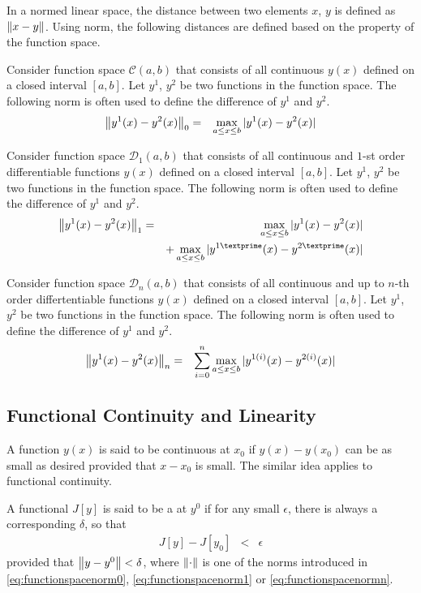 In a normed linear space, the distance between two elements $x$, $y$ is defined as $\left\lVert x-y\right\rVert$. Using norm, the following distances are defined based on the property of the function space.

Consider function space $\mathcal{C}(a,b)$ that consists of all continuous $y(x)$ defined on a closed interval $[a,b]$. Let $y^1$, $y^2$ be two functions in the function space. The following norm is often used to define the difference of $y^1$ and $y^2$.
\begin{eqnarray}
  \left\lVert y^1(x) - y^2(x)\right\rVert_0 &=& \max_{a\leq x \leq b} |y^1(x)-y^2(x)| \label{eq:functionspacenorm0}
\end{eqnarray}

Consider function space $\mathcal{D}_1(a,b)$ that consists of all continuous and $1$-st order differentiable functions $y(x)$ defined on a closed interval $[a,b]$. Let $y^1$, $y^2$ be two functions in the function space. The following norm is often used to define the difference of $y^1$ and $y^2$.
\begin{eqnarray}
  \norm{y^1(x) - y^2(x)}_1 &=& \max_{a\leq x \leq b} |y^1(x)-y^2(x)| \nonumber \\ && + \max_{a\leq x \leq b} |y^{1\textprime}(x)-y^{2\textprime}(x)| \label{eq:functionspacenorm1}
\end{eqnarray} 

Consider function space $\mathcal{D}_n(a,b)$ that consists of all continuous and up to $n$-th order differtentiable functions $y(x)$ defined on a closed interval $[a,b]$. Let $y^1$, $y^2$ be two functions in the function space. The following norm is often used to define the difference of $y^1$ and $y^2$.
\begin{eqnarray}
  \left\lVert y^1(x) - y^2(x)\right\rVert_n &=& \sum_{i=0}^{n} \max_{a\leq x \leq b} |y^{1(i)}(x)-y^{2(i)}(x)| \label{eq:functionspacenormn}
\end{eqnarray} 

\subsection{Functional Continuity and Linearity} \label{sec:functionalcontinuity}

A function $y(x)$ is said to be continuous at $x_0$ if $y(x) - y(x_0)$ can be as small as desired provided that $x-x_0$ is small. The similar idea applies to functional continuity. 

A functional $J[y]$ is said to be a  at $y^0$ if for any small $\epsilon$, there is always a corresponding $\delta$, so that
\begin{eqnarray}
  J[y] - J[y_0] &<& \epsilon \nonumber
\end{eqnarray}
provided that $\left\lVert y-y^0\right\rVert < \delta$, where $\left\lVert\cdot\right\rVert$ is one of the norms introduced in \eqref{eq:functionspacenorm0}, \eqref{eq:functionspacenorm1} or \eqref{eq:functionspacenormn}. 

